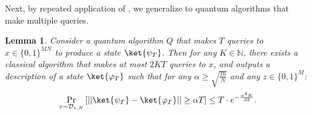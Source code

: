 \documentclass[11pt]{article}%
\newtheorem{lemma}[theorem]{Lemma}
\newcommand{\Naturals}{\mathbb{N}}
\begin{document}
Next, by repeated application of , we generalize  to quantum algorithms that make multiple queries.

\begin{lemma}
\label{lem:sparse_aaronson_ambainis_states}
Consider a quantum algorithm $Q$ that makes $T$ queries to $x \in \{0,1\}^{MN}$ to produce a state $\ket{\psi_T}$. Then for any $K \in \Naturals$, there exists a classical algorithm that makes at most $2KT$ queries to $x$, and outputs a description of a state $\ket{\varphi_T}$ such that for any $\alpha \ge \sqrt{\frac{16}{N}}$ and any $z \in \{0,1\}^M$:
\[
\Pr_{x \sim \mathcal{D}_{z,N}} \left[|| \ket{\psi_T} - \ket{\varphi_T}|| \ge \alpha T \right] \le T \cdot e^{-\frac{\alpha^4 K}{32}}.
\]
\end{lemma}
\end{document}
